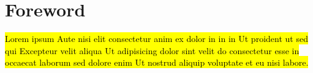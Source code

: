 \section*{Foreword} %
\hl{Lorem ipsum Aute nisi elit consectetur anim ex dolor in in in Ut proident ut sed qui Excepteur velit aliqua Ut adipisicing dolor sint velit do consectetur esse in occaecat laborum sed dolore enim Ut nostrud aliquip voluptate et eu nisi labore.}
